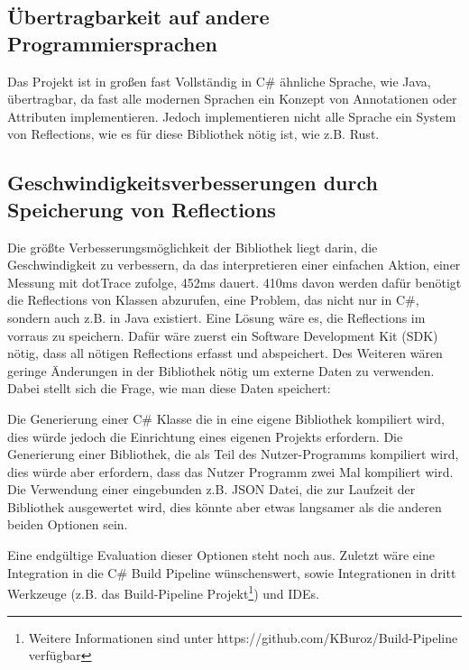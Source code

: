 \documentclass[a4paper,11pt,titlepage,ngerman]{article}
\begin{document}
\begin{sloppypar}
  \subsection{Übertragbarkeit auf andere Programmiersprachen}\label{subsec:PortabilityToOtherLangs}
  Das Projekt ist in gro\ss en fast Vollständig in C\# ähnliche Sprache, wie Java, übertragbar, da fast alle modernen Sprachen ein Konzept von Annotationen oder Attributen implementieren.
  Jedoch implementieren nicht alle Sprache ein System von Reflections, wie es für diese Bibliothek nötig ist, wie z.B. Rust.
  \subsection{Geschwindigkeitsverbesserungen durch Speicherung von Reflections}\label{subsec:StoringReflections}
  Die grö\ss te Verbesserungsmöglichkeit der Bibliothek liegt darin, die Geschwindigkeit zu verbessern,
  da das interpretieren einer einfachen Aktion, einer Messung mit dotTrace zufolge, 452ms dauert.
  410ms davon werden dafür benötigt die Reflections von Klassen abzurufen, eine Problem, das nicht nur in C\#, sondern auch z.B. in Java existiert.
  Eine Lösung wäre es, die Reflections im vorraus zu speichern.
  Dafür wäre zuerst ein Software Development Kit (SDK) nötig, dass all nötigen Reflections erfasst und abspeichert.
  Des Weiteren wären geringe \"Anderungen in der Bibliothek nötig um externe Daten zu verwenden.
  Dabei stellt sich die Frage, wie man diese Daten speichert:
  \begin{outline}
   \1 Die Generierung einer C\# Klasse die in eine eigene Bibliothek kompiliert wird, dies würde jedoch die Einrichtung eines eigenen Projekts erfordern.
   \1 Die Generierung einer Bibliothek, die als Teil des Nutzer-Programms kompiliert wird, dies würde aber erfordern, dass das Nutzer Programm zwei Mal kompiliert wird.
   \1 Die Verwendung einer eingebunden z.B. JSON Datei, die zur Laufzeit der Bibliothek ausgewertet wird, dies könnte aber etwas langsamer als die anderen beiden Optionen sein.
  \end{outline}
  Eine endgültige Evaluation dieser Optionen steht noch aus.
  Zuletzt wäre eine Integration in die C\# Build Pipeline wünschenswert, sowie Integrationen in dritt Werkzeuge (z.B. das Build-Pipeline
   Projekt\footnote{Weitere Informationen sind unter https://github.com/KBuroz/Build-Pipeline verfügbar}) und IDEs.

\end{sloppypar}
\end{document}
